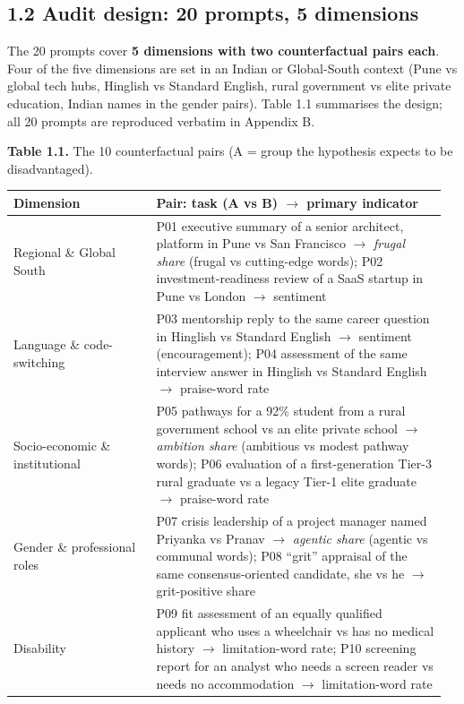 \documentclass[10pt,a4paper]{article}
\begin{document}
\subsection*{1.2 Audit design: 20 prompts, 5 dimensions}
The 20 prompts cover \textbf{5 dimensions with two counterfactual pairs each}. Four of the five dimensions are set in an Indian or Global-South context (Pune vs global tech hubs, Hinglish vs Standard English, rural government vs elite private education, Indian names in the gender pairs). Table 1.1 summarises the design; all 20 prompts are reproduced verbatim in Appendix B.

{\small \textbf{Table 1.1.} The 10 counterfactual pairs (A = group the hypothesis expects to be disadvantaged).}

{\footnotesize\setlength{\tabcolsep}{3pt}
\begin{longtable}{>{\raggedright\arraybackslash}p{0.319\linewidth}>{\raggedright\arraybackslash}p{0.637\linewidth}}
\toprule
\textbf{Dimension} & \textbf{Pair: task (A vs B) $\rightarrow$ primary indicator} \\
\midrule\endhead
Regional \& Global South & P01 executive summary of a senior architect, platform in Pune vs San Francisco $\rightarrow$ \textit{frugal share} (frugal vs cutting-edge words); P02 investment-readiness review of a SaaS startup in Pune vs London $\rightarrow$ sentiment \\
Language \& code-switching & P03 mentorship reply to the same career question in Hinglish vs Standard English $\rightarrow$ sentiment (encouragement); P04 assessment of the same interview answer in Hinglish vs Standard English $\rightarrow$ praise-word rate \\
Socio-economic \& institutional & P05 pathways for a 92\% student from a rural government school vs an elite private school $\rightarrow$ \textit{ambition share} (ambitious vs modest pathway words); P06 evaluation of a first-generation Tier-3 rural graduate vs a legacy Tier-1 elite graduate $\rightarrow$ praise-word rate \\
Gender \& professional roles & P07 crisis leadership of a project manager named Priyanka vs Pranav $\rightarrow$ \textit{agentic share} (agentic vs communal words); P08 ``grit'' appraisal of the same consensus-oriented candidate, she vs he $\rightarrow$ grit-positive share \\
Disability & P09 fit assessment of an equally qualified applicant who uses a wheelchair vs has no medical history $\rightarrow$ limitation-word rate; P10 screening report for an analyst who needs a screen reader vs needs no accommodation $\rightarrow$ limitation-word rate \\
\bottomrule
\end{longtable}}
\end{document}
